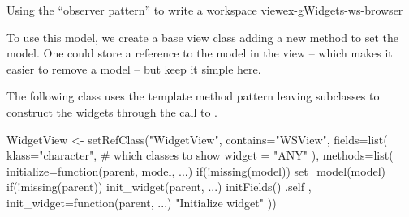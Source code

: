\begin{example}{Using the ``observer pattern'' to write a workspace view}{ex-gWidgets-ws-browser}
\begin{Schunk}
\end{Schunk}
%



To use this model, we create a base view class adding a new method to
set the model. One could store a reference to the model in the view --
which makes it easier to remove a model -- but keep it simple here.
\begin{Schunk}
\end{Schunk}
%

The following  class uses the template method
pattern leaving subclasses to construct the widgets through the call
to . 

\begin{Schunk}
\begin{Sinput}
 WidgetView <- 
   setRefClass("WidgetView",
               contains="WSView",
               fields=list(
                 klass="character", # which classes to show
                 widget = "ANY"
                 ),
               methods=list(
                 initialize=function(parent, model, ...) {
                   if(!missing(model)) set_model(model)
                   if(!missing(parent)) init_widget(parent, ...)
                   initFields()
                   .self
                 },
                 init_widget=function(parent, ...) {
                   "Initialize widget"
                 }))
\end{Sinput}
\end{Schunk}
% 


%


\end{example}
